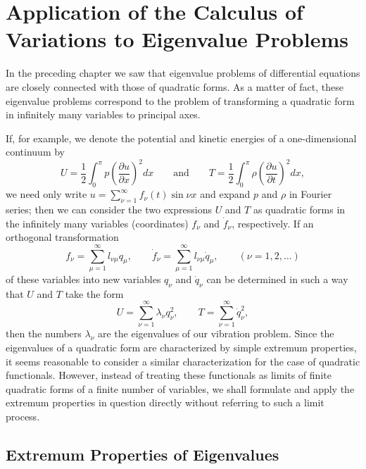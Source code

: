 \chapter{Application of the Calculus of Variations to Eigenvalue Problems}

In the preceding chapter we saw that eigenvalue problems of differential equations are closely connected with those of quadratic forms. As a matter of fact, these eigenvalue problems correspond to the problem of transforming a quadratic form in infinitely many variables to principal axes.

If, for example, we denote the potential and kinetic energies of a one-dimensional continuum by
\[
U=\frac12\int_0^\pi p\left(\frac{\partial u}{\partial x}\right)^2dx
\qquad\text{and}\qquad
T=\frac12\int_0^\pi \rho\left(\frac{\partial u}{\partial t}\right)^2dx,
\]
we need only write $u=\sum_{\nu=1}^{\infty}f_\nu(t)\sin \nu x$ and expand $p$ and $\rho$ in Fourier series; then we can consider the two expressions $U$ and $T$ as quadratic forms in the infinitely many variables (coordinates) $f_\nu$ and $\dot f_\nu$, respectively. If an orthogonal transformation
\[
f_\nu=\sum_{\mu=1}^{\infty}l_{\nu\mu}q_\mu,
\qquad
\dot f_\nu=\sum_{\mu=1}^{\infty}l_{\nu\mu}\dot q_\mu,
\qquad (\nu=1,2,\ldots)
\]
of these variables into new variables $q_\nu$ and $\dot q_\nu$ can be determined in such a way that $U$ and $T$ take the form
\[
U=\sum_{\nu=1}^{\infty}\lambda_\nu q_\nu^2,
\qquad
T=\sum_{\nu=1}^{\infty}\dot q_\nu^2,
\]
then the numbers $\lambda_\nu$ are the eigenvalues of our vibration problem. Since the eigenvalues of a quadratic form are characterized by simple extremum properties, it seems reasonable to consider a similar characterization for the case of quadratic functionals. However, instead of treating these functionals as limits of finite quadratic forms of a finite number of variables, we shall formulate and apply the extremum properties in question directly without referring to such a limit process.

\section{Extremum Properties of Eigenvalues}
